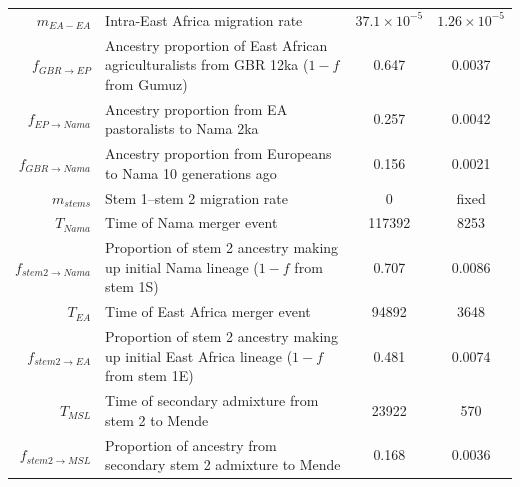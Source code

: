 \documentclass[]{article}
\begin{document}
\begin{table}[ht]
\begin{tabular}[t]{rP{8cm}cc}
    $m_{EA-EA}$ & Intra-East Africa migration rate & $37.1\times10^{-5}$ & $1.26\times10^{-5}$ \\
    $f_{GBR \rightarrow EP}$ & Ancestry proportion of East African agriculturalists from GBR 12ka ($1-f$ from Gumuz) & 0.647 & 0.0037 \\
    $f_{EP \rightarrow Nama}$ & Ancestry proportion from EA pastoralists to Nama 2ka & 0.257 & 0.0042 \\
    $f_{GBR \rightarrow Nama}$ & Ancestry proportion from Europeans to Nama 10 generations ago & 0.156 & 0.0021 \\
    $m_{stems}$ & Stem 1--stem 2 migration rate & $0$ & fixed \\
    $T_{Nama}$ & Time of Nama merger event & 117392 & 8253 \\
    $f_{stem 2 \rightarrow Nama}$ & Proportion of stem 2 ancestry making up initial Nama lineage ($1-f$ from stem 1S) & 0.707 & 0.0086 \\
    $T_{EA}$ & Time of East Africa merger event & 94892 & 3648 \\
    $f_{stem 2 \rightarrow EA}$ & Proportion of stem 2 ancestry making up initial East Africa lineage ($1-f$ from stem 1E) & 0.481 & 0.0074 \\
    $T_{MSL}$ & Time of secondary admixture from stem 2 to Mende & 23922 & 570 \\
    $f_{stem 2 \rightarrow MSL}$ & Proportion of ancestry from secondary stem 2 admixture to Mende & 0.168 & 0.0036 \\
    \bottomrule
\end{tabular}
\end{table}
\end{document}
